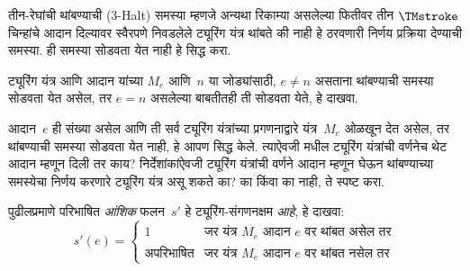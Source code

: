 \documentclass[../../../include/open-logic-section]{subfiles}
\begin{document}
\begin{prob}
तीन-रेघांची थांबण्याची (3-Halt) समस्या
म्हणजे अन्यथा रिकाम्या असलेल्या फितीवर
तीन $\TMstroke$ चिन्हांचे आदान दिल्यावर
स्वैरपणे निवडलेले ट्यूरिंग यंत्र थांबते
की नाही हे ठरवणारी निर्णय प्रक्रिया
देण्याची समस्या. ही समस्या
सोडवता येत नाही हे सिद्ध करा.
\end{prob}

\begin{prob}
ट्यूरिंग यंत्र आणि आदान यांच्या
$M_e$ आणि~$n$ या जोड्यांसाठी,
$e \neq n$ असताना थांबण्याची समस्या
सोडवता येत असेल, तर $e = n$
असलेल्या बाबतीतही ती सोडवता
येते, हे दाखवा.
\end{prob}

\begin{prob}
आदान~$e$ ही संख्या असेल आणि ती
सर्व ट्यूरिंग यंत्रांच्या प्रगणनाद्वारे
यंत्र~$M_e$ ओळखून देत असेल,
तर थांबण्याची समस्या सोडवता
येत नाही, हे आपण सिद्ध केले.
त्याऐवजी 
मधील ट्यूरिंग यंत्रांची वर्णनेच
थेट आदान म्हणून दिली तर काय?
निर्देशांकांऐवजी ट्यूरिंग यंत्रांची
वर्णने आदान म्हणून घेऊन थांबण्याच्या
समस्येचा निर्णय करणारे ट्यूरिंग
यंत्र असू शकते का? का किंवा
का नाही, ते स्पष्ट करा.
\end{prob}

\begin{prob} पुढीलप्रमाणे परिभाषित
  \emph{आंशिक} फलन~$s'$ हे
  ट्यूरिंग-संगणनक्षम \emph{आहे},
  हे दाखवा:
  \[
  s'(e) =
  \begin{cases}
    \text{1} & \text{जर यंत्र~$M_e$ आदान $e$ वर थांबत असेल तर}\\
    \text{अपरिभाषित} & \text{जर यंत्र~$M_e$ आदान $e$ वर थांबत नसेल तर}
  \end{cases}
  \]
\end{prob}
\end{document}
